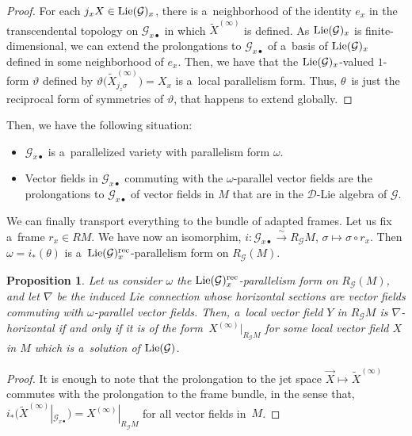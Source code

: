 \documentclass[pdftex]{sigma}
\numberwithin{equation}{section}
\newtheorem{Proposition}[Theorem]{Proposition}
\theoremstyle{definition}
\begin{document}
\begin{proof}
For each $j_x X\in {\rm Lie}(\mathcal G)_x$, there is a~neighborhood of the identity $e_{x}$ in the transcendental topology on $\mathcal G_{x\bullet}$ in which $\widetilde X^{(\infty)}$ is defined. As ${\rm Lie}(\mathcal G)_x$ is finite-dimensional, we can extend the prolongations to $\mathcal G_{x\bullet}$ of a~basis of
${\rm Lie}(\mathcal G)_x$ defined in some neighborhood of $e_x$. Then, we have that the ${\rm Lie}(\mathcal G)_x$-valued $1$-form $\vartheta$ defined by $\vartheta\bigl(\widetilde X^{(\infty)}_{j_z\sigma}\bigr) = X_x$ is a~local parallelism form. Thus, $\theta$~is just the reciprocal form of symmetries of $\vartheta$, that happens to extend globally.
\end{proof}

Then, we have the following situation:
\begin{itemize}\itemsep=0pt
\item[(a)] $\mathcal G_{x\bullet}$ is a~parallelized variety with parallelism form $\omega$.
\item[(b)] Vector fields in $\mathcal G_{x\bullet}$ commuting with the $\omega$-parallel vector fields are the prolongations to $\mathcal G_{x\bullet}$ of vector fields in $M$ that are in the $\mathcal D$-Lie algebra of $\mathcal G$.
\end{itemize}

We can finally transport everything to the bundle of adapted frames. Let us fix a~frame $r_x\in RM$. We have now an isomorphim,
$i\colon \mathcal G_{x\bullet} \xrightarrow{\sim} R_{\mathcal G}M$, $ \sigma \mapsto \sigma\circ r_x$.
Then $\omega = i_*(\theta)$ is a~${\rm Lie}(\mathcal G)_x^{\rm rec}$-parallelism form on $R_{\mathcal G}(M)$.

\begin{Proposition}
 Let us consider $\omega$ the ${\rm Lie}(\mathcal G)_x^{\rm rec}$-parallelism form on $R_{\mathcal G}(M)$, and
let $\nabla$ be the induced Lie connection whose horizontal sections are vector fields commuting with $\omega$-parallel vector fields. Then, a~local vector field $Y$ in $R_\mathcal GM$ is $\nabla$-horizontal if and only if it is of the form~$X^{(\infty)}|_{R_\mathcal GM}$ for some local vector field $X$ in $M$ which is a~solution of ${\rm Lie}(\mathcal G)$.
\end{Proposition}

\begin{proof}
It is enough to note that the prolongation to the jet space $\vec X\mapsto \widetilde X^{(\infty)}$ commutes with the prolongation to the frame bundle, in the sense that, $i_*\bigl(\widetilde X^{(\infty)}|_{\mathcal G_{x\bullet}}\bigr) = X^{(\infty)}|_{R_\mathcal GM}$ for all vector fields in~$M$.
\end{proof}
\end{document}
